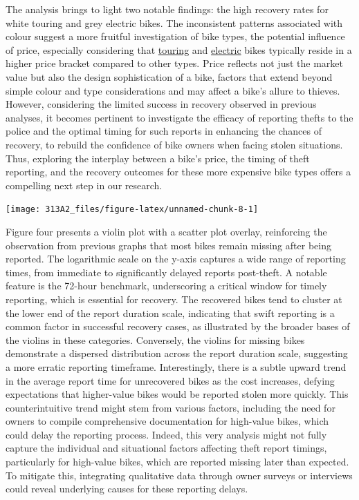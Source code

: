 \documentclass[
  11pt,
]{article}
\begin{document}
\indent The analysis brings to light two notable findings: the high
recovery rates for white touring and grey electric bikes. The
inconsistent patterns associated with colour suggest a more fruitful
investigation of bike types, the potential influence of price,
especially considering that
\href{https://tomsbiketrip.com/which-touring-bike-should-i-buy/}{touring}
and \href{https://gitnux.org/ebike-statistics/}{electric} bikes
typically reside in a higher price bracket compared to other types.
Price reflects not just the market value but also the design
sophistication of a bike, factors that extend beyond simple colour and
type considerations and may affect a bike's allure to thieves. However,
considering the limited success in recovery observed in previous
analyses, it becomes pertinent to investigate the efficacy of reporting
thefts to the police and the optimal timing for such reports in
enhancing the chances of recovery, to rebuild the confidence of bike
owners when facing stolen situations. Thus, exploring the interplay
between a bike's price, the timing of theft reporting, and the recovery
outcomes for these more expensive bike types offers a compelling next
step in our research.

\begin{center}\texttt{[image: 313A2\_files/figure-latex/unnamed-chunk-8-1]} \end{center}

\indent Figure four presents a violin plot with a scatter plot overlay,
reinforcing the observation from previous graphs that most bikes remain
missing after being reported. The logarithmic scale on the y-axis
captures a wide range of reporting times, from immediate to
significantly delayed reports post-theft. A notable feature is the
72-hour benchmark, underscoring a critical window for timely reporting,
which is essential for recovery. The recovered bikes tend to cluster at
the lower end of the report duration scale, indicating that swift
reporting is a common factor in successful recovery cases, as
illustrated by the broader bases of the violins in these categories.
Conversely, the violins for missing bikes demonstrate a dispersed
distribution across the report duration scale, suggesting a more erratic
reporting timeframe. Interestingly, there is a subtle upward trend in
the average report time for unrecovered bikes as the cost increases,
defying expectations that higher-value bikes would be reported stolen
more quickly. This counterintuitive trend might stem from various
factors, including the need for owners to compile comprehensive
documentation for high-value bikes, which could delay the reporting
process. Indeed, this very analysis might not fully capture the
individual and situational factors affecting theft report timings,
particularly for high-value bikes, which are reported missing later than
expected. To mitigate this, integrating qualitative data through owner
surveys or interviews could reveal underlying causes for these reporting
delays.
\end{document}
